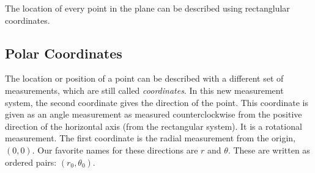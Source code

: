 \documentclass{ximera}
\begin{document}
\begin{image}
\end{image}





The location of every point in the plane can be described using rectanglular coordinates.








\subsection*{Polar Coordinates}



The location or position of a point can be described with a different set of measurements, which are still called \textit{coordinates}.  In this new measurement system, the second coordinate gives the direction of the point. This coordinate is given as an angle measurement as measured counterclockwise from the positive direction of the horizontal axis (from the rectangular system). It is a rotational measurement.  The first coordinate is the radial measurement from the origin, $(0,0)$. Our favorite names for these directions are $r$ and $\theta$. These are written as ordered pairs: $(r_0, \theta_0)$.
\end{document}
